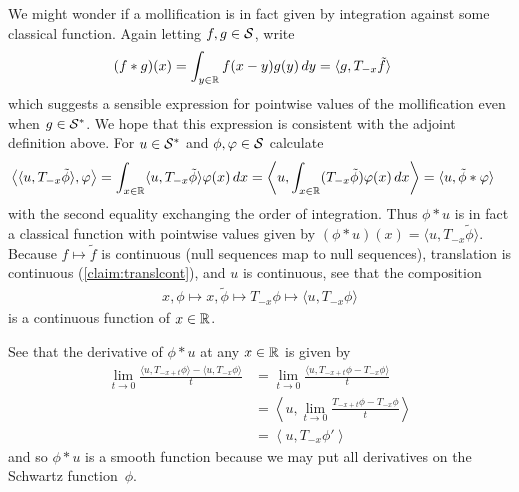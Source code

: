     We might wonder if a mollification is in fact given by integration against some classical function.
    Again letting $f,g\in\S$, write
    \begin{align*}
      (f*g)(x)
      &= \int_{y\in\R} f(x-y)g(y)\,dy
      = \langle g, T_{-x}\tilde f\rangle
    \end{align*}
    which suggests a sensible expression for pointwise values of the mollification even when $g\in\SS$.
    We hope that this expression is consistent with the adjoint definition above.
    For $u\in\SS$ and $\phi,\varphi\in\S$ calculate
    \begin{align*}
      \left\langle \langle u,T_{-x}\tilde\phi\rangle, \varphi \right\rangle
      &= \int_{x\in\R} \langle u,T_{-x}\tilde\phi\rangle\varphi(x)\,dx
      = \left\langle u, \int_{x\in\R} (T_{-x}\tilde\phi)\varphi(x)\,dx \right\rangle
      = \langle u, \tilde\phi*\varphi\rangle
    \end{align*}
    with the second equality exchanging the order of integration.
    Thus $\phi*u$ is in fact a classical function with pointwise values given by $(\phi*u)(x)=\langle u, T_{-x}\tilde\phi\rangle$.
    Because $f\mapsto\tilde f$ is continuous (null sequences map to null sequences), translation is continuous (\cref{claim:translcont}), and $u$ is continuous, see that the composition
    \begin{align*}
      x, \phi \mapsto x, \tilde\phi \mapsto T_{-x}\phi \mapsto \langle u, T_{-x}\phi \rangle
    \end{align*}
    is a continuous function of $x\in\R$.
    
    See that the derivative of $\phi*u$ at any $x\in\R$ is given by
    \begin{align*}
      \lim_{t\rightarrow0} \frac{\langle u, T_{-x+t}\phi\rangle - \langle u, T_{-x}\phi\rangle}{t}
      &= \lim_{t\rightarrow0} \frac{\langle u, T_{-x+t}\phi-T_{-x}\phi\rangle}{t}
      \\&= \left\langle u, \lim_{t\rightarrow0} \frac{T_{-x+t}\phi-T_{-x}\phi}{t}\right\rangle
      \\&= \left\langle u, T_{-x}\phi'\right\rangle
    \end{align*}
    and so $\phi*u$ is a smooth function because we may put all derivatives on the Schwartz function~$\phi$.

